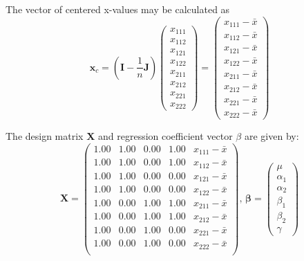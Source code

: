 \documentclass[11pt]{article}
\begin{document}
The vector of centered x-values may be calculated as $$\bm{x}_c = (\bm{I}-
\frac{1}{n} \bm{J}) \begin{pmatrix} x_{111} \\ x_{112} \\  x_{121}
\\ x_{122} \\ x_{211} \\ x_{212} \\ x_{221} \\ x_{222} \end{pmatrix}
= \begin{pmatrix} x_{111} -\bar{x} \\ x_{112} - \bar{x} \\  x_{121} - \bar{x}
\\ x_{122} -\bar{x} \\ x_{211} -\bar{x} \\ x_{212} -\bar{x}
\\ x_{221} - \bar{x} \\ x_{222} -\bar{x} \end{pmatrix}$$




The design matrix \textbf{X}  and regression coefficient vector \textbf{$\beta$} are given by: 
$$\mathbf{X} =
\begin{pmatrix}{}
  1.00 & 1.00 & 0.00 & 1.00 & x_{111} -\bar{x}\\ 
  1.00 & 1.00 & 0.00 & 1.00 & x_{112} -\bar{x} \\ 
  1.00 & 1.00 & 0.00 & 0.00 & x_{121} -\bar{x}\\ 
  1.00 & 1.00 & 0.00 & 0.00 & x_{122} -\bar{x}\\ 
  1.00 & 0.00 & 1.00 & 1.00 & x_{211} -\bar{x}\\ 
  1.00 & 0.00 & 1.00 & 1.00 & x_{212} -\bar{x}\\ 
  1.00 & 0.00 & 1.00 & 0.00 & x_{221} -\bar{x}\\ 
  1.00 & 0.00 & 1.00 & 0.00 & x_{222} -\bar{x}\\ 
  \end{pmatrix},\,
\mathbf{\beta} = \begin{pmatrix} \mu \\ \alpha_1 \\ \alpha_2
\\ \beta_1 \\ \beta_2 \\ \gamma \end{pmatrix}$$
\end{document}
